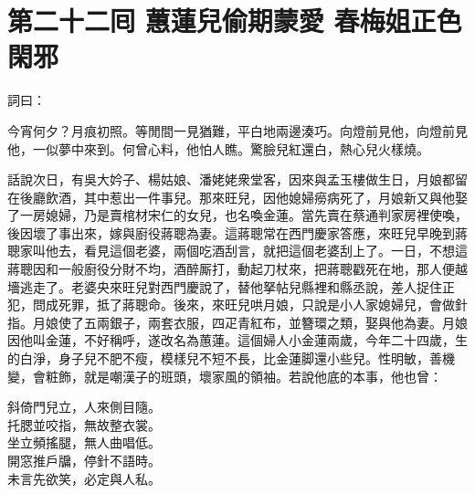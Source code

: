 
\chapter*{第二十二囘 蕙蓮兒偷期蒙愛 春梅姐正色閑邪}


詞曰：

\begin{myquote} 
今宵何夕？月痕初照。等閒間一見猶難，平白地兩邊湊巧。向燈前見他，向燈前見他，一似夢中來到。何曾心料，他怕人瞧。驚臉兒紅還白，熱心兒火樣燒。

\end{myquote} 

話說次日，有吳大妗子、楊姑娘、潘姥姥衆堂客，因來與孟玉樓做生日，月娘都留在後廳飲酒，其中惹出一件事兒。那來旺兒，因他媳婦癆病死了，月娘新又與他娶了一房媳婦，乃是賣棺材宋仁的女兒，也名喚金蓮。{}當先賣在蔡通判家房裡使喚，後因壞了事出來，嫁與廚役蔣聰為妻。這蔣聰常在西門慶家答應，來旺兒早晚到蔣聰家叫他去，看見這個老婆，兩個吃酒刮言，就把這個老婆刮上了。一日，不想這蔣聰因和一般廚役分財不均，酒醉厮打，動起刀杖來，把蔣聰戳死在地，那人便越墻逃走了。老婆央來旺兒對西門慶說了，替他拏帖兒縣裡和縣丞說，差人捉住正犯，問成死罪，抵了蔣聰命。{}後來，來旺兒哄月娘，只說是小人家媳婦兒，會做針指。月娘使了五兩銀子，兩套衣服，四疋青紅布，並簪環之類，娶與他為妻。月娘因他叫金蓮，不好稱呼，遂改名為蕙蓮。這個婦人小金蓮兩歲，今年二十四歲，生的白淨，身子兒不肥不瘦，模樣兒不短不長，比金蓮脚還小些兒。性明敏，善機變，會粧飾，{}就是嘲漢子的班頭，壞家風的領袖。若說他底的本事，他也曾：

\begin{myquote} 
斜倚門兒立，人來側目隨。\\托腮並咬指，無故整衣裳。\\坐立頻搖腿，無人曲唱低。\\開窓推戶牖，停針不語時。{}\\未言先欲笑，必定與人私。
\end{myquote} 

